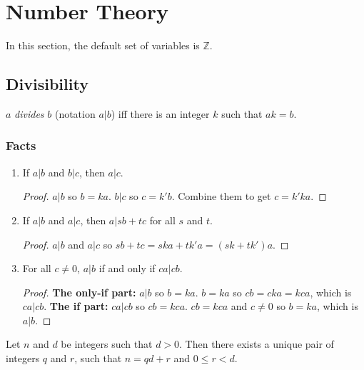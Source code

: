 \documentclass[11pt]{article}
\begin{document}
\section{Number Theory}

In this section, the default set of variables is $\mathbb{Z}$.

\subsection{Divisibility}

\begin{definition}
$a$ \emph{divides} $b$ (notation $a|b$) iff there is an integer $k$ such that $ak=b$.
\end{definition}

\subsubsection{Facts}

\begin{enumerate}
\item If $a|b$ and $b|c$, then $a|c$.
\begin{proof}
$a|b$ so $b=ka$. $b|c$ so $c=k'b$. Combine them to get $c=k'ka$.
\end{proof}

\item If $a|b$ and $a|c$, then $a|sb+tc$ for all $s$ and $t$.
\begin{proof}
$a|b$ and $a|c$ so $sb+tc=ska+tk'a=(sk+tk')a$.
\end{proof}

\item For all $c \neq 0$, $a|b$ if and only if $ca|cb$.
\begin{proof}
\textbf{The only-if part:} $a|b$ so $b=ka$. $b=ka$ so $cb=cka=kca$, which is $ca|cb$.
\textbf{The if part:} $ca|cb$ so $cb=kca$. $cb=kca$ and $c \neq 0$ so $b=ka$, which is
$a|b$.
\end{proof}

\end{enumerate}

\begin{theorem}
Let $n$ and $d$ be integers such that $d > 0$. Then there exists a unique pair of integers
$q$ and $r$, such that $n = qd+r$ and $0 \leq r < d$.
\end{theorem}
\end{document}
